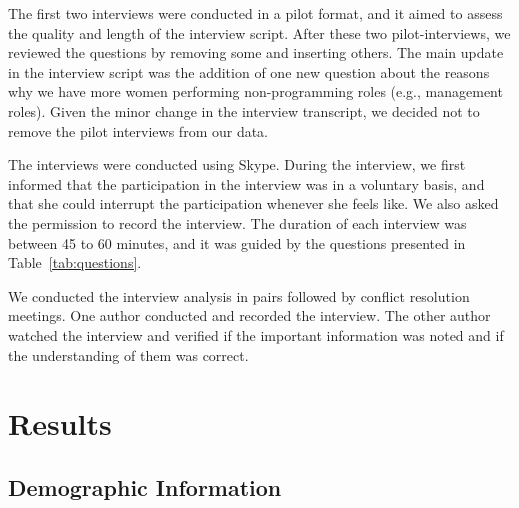 \documentclass{IEEEcsmag}
\newcommand{\secref}[1]{\nameref{#1}}
\begin{document}
The first two interviews were conducted in a pilot format, and it aimed to assess the quality and length of the interview script. After these two pilot-interviews, we reviewed the questions by removing some and inserting others. The main update in the interview script was the addition of one new question about the reasons why we have more women performing non-programming roles (e.g., management roles). Given the minor change in the interview transcript, we decided not to remove the pilot interviews from our data.

The interviews were conducted using Skype. During the interview, we first informed that the participation in the interview was in a voluntary basis, and that she could interrupt the participation whenever she feels like. We also asked the permission to record the interview. The duration of each interview was between 45 to 60 minutes, and it was guided by the questions presented in Table~\ref{tab:questions}.

We conducted the interview analysis in pairs followed by conflict resolution meetings. One author conducted and recorded the interview. The other author watched the interview and verified if the important information was noted and if the understanding of them was correct. 

\section{Results}

\subsection{Demographic Information}
\label{subsec:dem}

\end{document}
